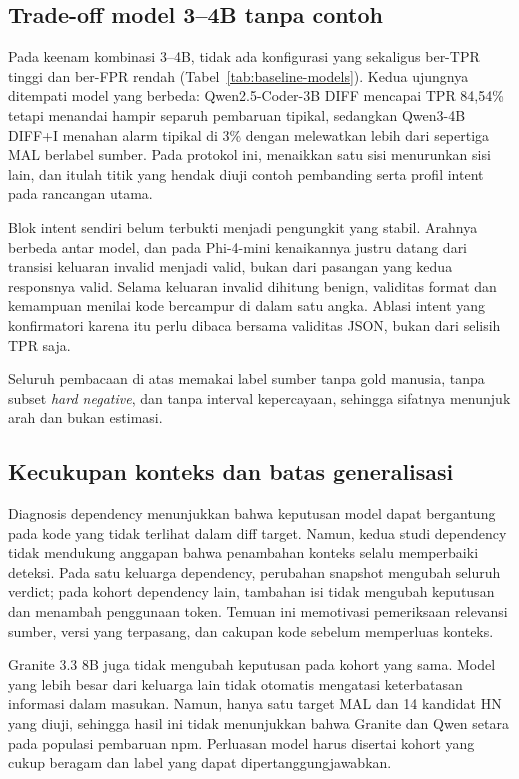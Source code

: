 \subsection{Trade-off model 3--4B tanpa contoh}

Pada keenam kombinasi 3--4B, tidak ada konfigurasi yang sekaligus ber-TPR
tinggi dan ber-FPR rendah (Tabel~\ref{tab:baseline-models}). Kedua ujungnya
ditempati model yang berbeda: Qwen2.5-Coder-3B DIFF mencapai TPR 84,54\%
tetapi menandai hampir separuh pembaruan tipikal, sedangkan Qwen3-4B DIFF+I
menahan alarm tipikal di 3\% dengan melewatkan lebih dari sepertiga MAL
berlabel sumber. Pada protokol ini, menaikkan satu sisi menurunkan sisi lain,
dan itulah titik yang hendak diuji contoh pembanding serta profil intent pada
rancangan utama.

Blok intent sendiri belum terbukti menjadi pengungkit yang stabil. Arahnya
berbeda antar model, dan pada Phi-4-mini kenaikannya justru datang dari
transisi keluaran invalid menjadi valid, bukan dari pasangan yang kedua
responsnya valid. Selama keluaran invalid dihitung benign, validitas format
dan kemampuan menilai kode bercampur di dalam satu angka. Ablasi intent yang
konfirmatori karena itu perlu dibaca bersama validitas JSON, bukan dari
selisih TPR saja.

Seluruh pembacaan di atas memakai label sumber tanpa gold manusia, tanpa
subset \emph{hard negative}, dan tanpa interval kepercayaan, sehingga sifatnya
menunjuk arah dan bukan estimasi.

\subsection{Kecukupan konteks dan batas generalisasi}

Diagnosis dependency menunjukkan bahwa keputusan model dapat bergantung
pada kode yang tidak terlihat dalam diff target. Namun, kedua studi dependency
tidak mendukung anggapan bahwa penambahan konteks selalu memperbaiki deteksi.
Pada satu keluarga dependency, perubahan snapshot mengubah seluruh verdict;
pada kohort dependency lain, tambahan isi tidak mengubah keputusan dan
menambah penggunaan token. Temuan ini memotivasi pemeriksaan relevansi sumber,
versi yang terpasang, dan cakupan kode sebelum memperluas konteks.

Granite 3.3 8B juga tidak mengubah keputusan pada kohort yang sama. Model yang
lebih besar dari keluarga lain tidak otomatis mengatasi keterbatasan
informasi dalam masukan. Namun, hanya satu target MAL dan 14 kandidat HN
yang diuji, sehingga hasil ini tidak menunjukkan bahwa Granite dan Qwen
setara pada populasi pembaruan npm. Perluasan model harus disertai kohort
yang cukup beragam dan label yang dapat dipertanggungjawabkan.


